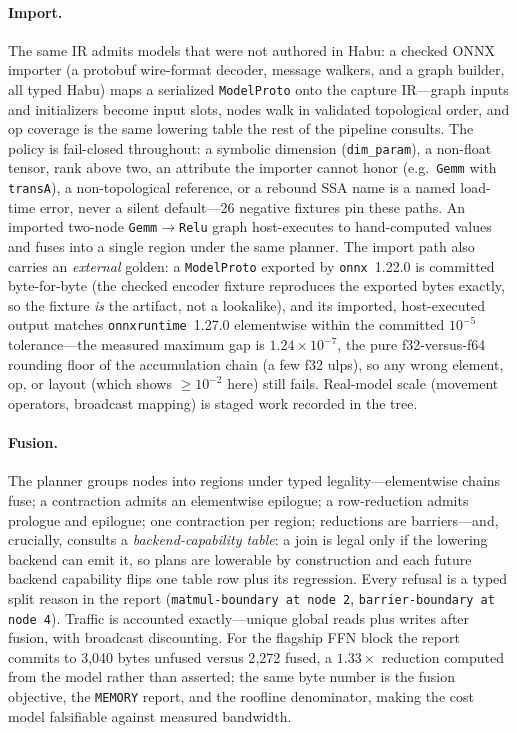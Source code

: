 \documentclass[11pt]{article}
\newcommand{\code}[1]{\texttt{#1}}
\begin{document}
\paragraph{Import.} The same IR admits models that were not authored in
Habu: a checked ONNX importer (a protobuf wire-format decoder, message
walkers, and a graph builder, all typed Habu) maps a serialized
\code{ModelProto} onto the capture IR---graph inputs and initializers
become input slots, nodes walk in validated topological order, and op
coverage is the same lowering table the rest of the pipeline consults.
The policy is fail-closed throughout: a symbolic dimension
(\code{dim\_param}), a non-float tensor, rank above two, an attribute the
importer cannot honor (e.g.\ \code{Gemm} with \code{transA}), a
non-topological reference, or a rebound SSA name is a named load-time
error, never a silent default---26 negative fixtures pin these paths. An
imported two-node \code{Gemm}$\to$\code{Relu} graph host-executes to
hand-computed values and fuses into a single region under the same
planner. The import path also carries an \emph{external} golden: a
\code{ModelProto} exported by \code{onnx}~1.22.0 is committed
byte-for-byte (the checked encoder fixture reproduces the exported bytes
exactly, so the fixture \emph{is} the artifact, not a lookalike), and its
imported, host-executed output matches \code{onnxruntime}~1.27.0
elementwise within the committed $10^{-5}$ tolerance---the measured
maximum gap is $1.24\times10^{-7}$, the pure f32-versus-f64 rounding
floor of the accumulation chain (a few f32 ulps), so any wrong element,
op, or layout (which shows $\ge 10^{-2}$ here) still fails. Real-model
scale (movement operators, broadcast mapping) is staged work recorded in
the tree.

\paragraph{Fusion.} The planner groups nodes into regions under typed
legality---elementwise chains fuse; a contraction admits an elementwise
epilogue; a row-reduction admits prologue and epilogue; one contraction
per region; reductions are barriers---and, crucially, consults a
\emph{backend-capability table}: a join is legal only if the lowering
backend can emit it, so plans are lowerable by construction and each
future backend capability flips one table row plus its regression. Every
refusal is a typed split reason in the report
(\code{matmul-boundary at node 2}, \code{barrier-boundary at node 4}).
Traffic is accounted exactly---unique global reads plus writes after
fusion, with broadcast discounting. For the flagship FFN block the report
commits to 3{,}040 bytes unfused versus 2{,}272 fused, a $1.33\times$
reduction computed from the model rather than asserted; the same byte
number is the fusion objective, the \code{MEMORY} report, and the
roofline denominator, making the cost model falsifiable against measured
bandwidth.
\end{document}
